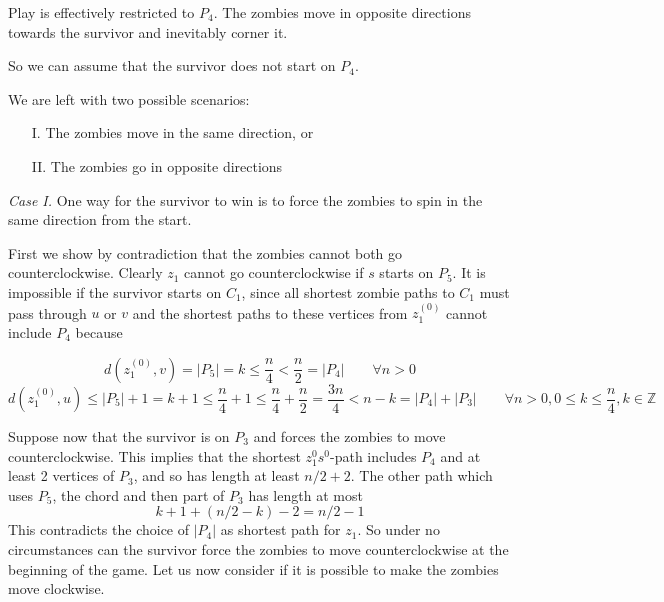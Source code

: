 \documentclass[letterpaper, 10pt]{article}
\newcommand{\Z}{\mathbb{Z}}
\begin{document}
\begin{enumerate}
       Play is effectively restricted to $P_4$. The zombies
       move in opposite directions towards the survivor and inevitably corner it.

       So we can assume that the survivor does not start on $P_4$.





       We are left with two possible scenarios:

       \begin{enumerate}
        \item[I.] The zombies move in the same direction, or
        \item[II.] The zombies go in opposite directions
       \end{enumerate}

       \emph{Case I.} One way for the survivor to win is to force the zombies to
       spin in the same direction from the start.

       First we show by contradiction that the zombies cannot both go counterclockwise.
       Clearly $z_1$ cannot go counterclockwise if $s$ starts on $P_5$.
       It is impossible if the survivor starts on $C_1$, since all shortest zombie paths
       to $C_1$ must pass through $u$ or $v$ and the shortest paths to these vertices from $z_1^{(0)}$
       cannot include $P_4$ because

       \[ d(z_1^{(0)}, v) = |P_5| = k \leq \frac{n}{4} < \frac{n}{2} = |P_4| \qquad \forall n > 0\]
       \[ d(z_1^{(0)}, u) \leq |P_5| + 1 = k + 1 \leq \frac{n}{4} +1 \leq \frac{n}{4} + \frac{n}{2} = \frac{3n}{4} < n -k = |P_4| + |P_3| \qquad \forall n > 0, 0 \leq k \leq \frac{n}{4}, k \in \Z\]

       Suppose now that the survivor is on $P_3$ and forces the zombies to move counterclockwise.
       This implies that the shortest $z_1^0s^0$-path includes $P_4$ and at least 2 vertices of $P_3$,
       and so has length at least $n/2 + 2$. The other path which uses $P_5$,
       the chord and then part of $P_3$ has length at most
       \[k + 1 + (n/2 -k) -2 = n/2 -1\]
       This contradicts the choice of $|P_4|$ as shortest path for $z_1$.
       So under no circumstances can the survivor force the zombies to move counterclockwise
       at the beginning of the game.
       Let us now consider if it is possible to make the zombies move clockwise.


\end{enumerate}
\end{document}
